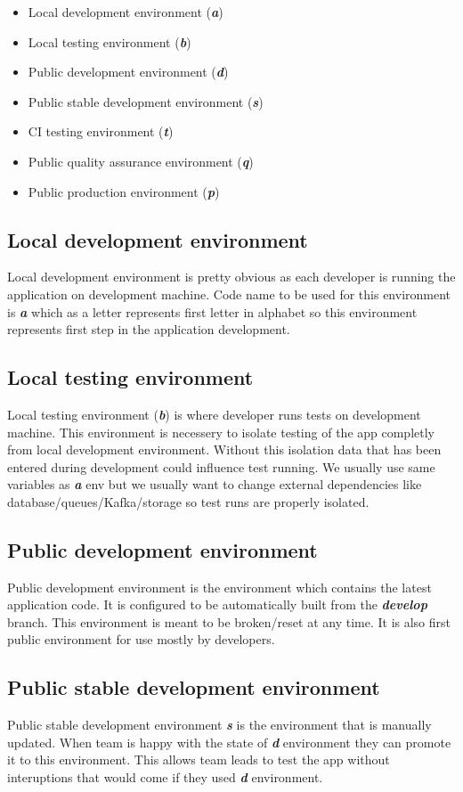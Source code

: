 \documentclass[lang=en,color=green]{elegantbook}
\newcommand{\bi}[1]{\textit{\textbf{#1}}}
\begin{document}
\begin{itemize}
    \item Local development environment (\bi{a})
    \item Local testing environment (\bi{b})
    \item Public development environment (\bi{d})
    \item Public stable development environment (\bi{s})
    \item CI testing environment (\bi{t})
    \item Public quality assurance environment (\bi{q})
    \item Public production environment (\bi{p})
\end{itemize}

\subsection{Local development environment}
Local development environment is pretty obvious as each developer 
is running the application on development machine.
Code name to be used for this environment is \bi{a} which as a letter
represents first letter in alphabet so this environment represents 
first step in the application development.

\subsection{Local testing environment}
Local testing environment (\bi{b}) is where developer runs tests on development
machine. This environment is necessery to isolate testing of the app
completly from local development environment. Without this isolation
data that has been entered during development could influence
test running. We usually use same variables
as \bi{a} env but we usually want to change external dependencies
like database/queues/Kafka/storage so test runs are properly isolated.

\subsection{Public development environment}
Public development environment is the environment which contains the
latest application code. It is configured to be automatically built 
from the \bi{develop} branch. This environment is meant to be 
broken/reset at any time. It is also first public environment for use 
mostly by developers.

\subsection{Public stable development environment}
Public stable development environment \bi{s} is the environment that is 
manually updated. When team is happy with the state of \bi{d} environment
they can promote it to this environment. This allows team leads 
to test the app without interuptions that would come if they used \bi{d} 
environment.
\end{document}
